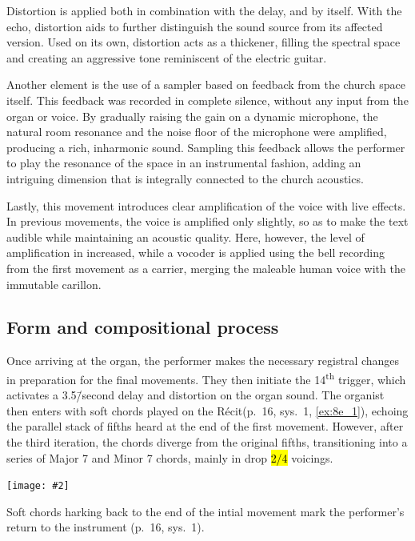 \documentclass[12pt,twoside,maitrise]{dms_ks}
\newcommand{\customincludeexamples}[4][]{%
    \begin{example}[H]
        \centering
        \texttt{[image: \#2]}
        \caption{#4}
	\label{#3} 
    \end{example}
}
\theoremstyle{definition}
\begin{document}
{Distortion is applied both in combination with the delay, and by itself.
With the echo, distortion aids to further distinguish the sound source from its affected version.
Used on its own, distortion acts as a thickener, filling the spectral space and creating an aggressive tone reminiscent of the electric guitar.

Another element is the use of a sampler based on feedback from the church space itself. 
This feedback was recorded in complete silence, without any input from the organ or voice. 
By gradually raising the gain on a dynamic microphone, the natural room resonance and the noise floor of the microphone were amplified, producing a rich, inharmonic sound. 
Sampling this feedback allows the performer to play the resonance of the space in an instrumental fashion, adding an intriguing dimension that is integrally connected to the church acoustics. 

Lastly, this movement introduces clear amplification of the voice with live effects. In previous movements, the voice is amplified only slightly, so as to make the text audible while maintaining an acoustic quality.
Here, however, the level of amplification in increased, while a vocoder is applied using the bell recording from the first movement as a carrier, merging the maleable human voice with the immutable carillon.

\subsection{Form and compositional process}

Once arriving at the organ, the performer makes the necessary registral changes in preparation for the final movements. 
They then initiate the 14\textsuperscript{th} trigger, which activates a 3.5\=/second delay and distortion on the organ sound. 
The organist then enters with soft chords played on the Récit(p.~16, sys.~1, \cref{ex:8e_1}), echoing the parallel stack of fifths heard at the end of the first movement. 
However, after the third iteration, the chords diverge from the original fifths, transitioning into a series of Major 7 and Minor 7 chords, mainly in drop \hl{2/4} voicings. 

\customincludeexamples[width=\textwidth]{8e_1}{ex:8e_1}{Soft chords harking back to the end of the intial movement mark the performer's return to the instrument (p.~16, sys.~1).}

}
\end{document}
